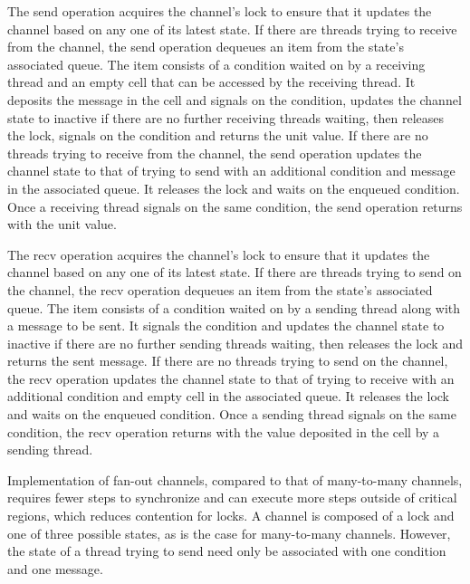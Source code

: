 \documentclass{article}
\begin{document}
The send operation acquires the channel's lock to ensure that it updates the channel based on
any one of its latest state.  If there are threads trying to receive from the channel, the send
operation dequeues an item from the state's associated queue.  The item consists of a condition
waited on by a receiving thread and an empty cell that can be accessed by the receiving thread.
It deposits the message in the cell and signals on the condition, updates the channel state to
inactive if there are no further receiving threads waiting, then releases the lock, signals on
the condition and returns the unit value.  If there are no threads trying to receive from the
channel, the send operation updates the channel state to that of trying to send with an
additional condition and message in the associated queue.  It releases the lock and waits on
the enqueued condition.  Once a receiving thread signals on the same condition, the send
operation returns with the unit value.

The recv operation acquires the channel's lock to ensure that it updates the channel based on
any one of its latest state.  If there are threads trying to send on the channel, the recv
operation dequeues an item from the state's associated queue.  The item consists of a condition
waited on by a sending thread along with a message to be sent.  It signals the condition and
updates the channel state to inactive if there are no further sending threads waiting, then
releases the lock and returns the sent message.  If there are no threads trying to send on the
channel, the recv operation updates the channel state to that of trying to receive with an
additional condition and empty cell in the associated queue.  It releases the lock and waits on
the enqueued condition.  Once a sending thread signals on the same condition, the recv
operation returns with the value deposited in the cell by a sending thread.


Implementation of fan-out channels, compared to that of many-to-many channels, requires fewer
steps to synchronize and can execute more steps outside of critical regions, which reduces
contention for locks.  A channel is composed of a lock and one of three possible states, as is
the case for many-to-many channels.  However, the state of a thread trying to send need only be
associated with one condition and one message.  
\end{document}
